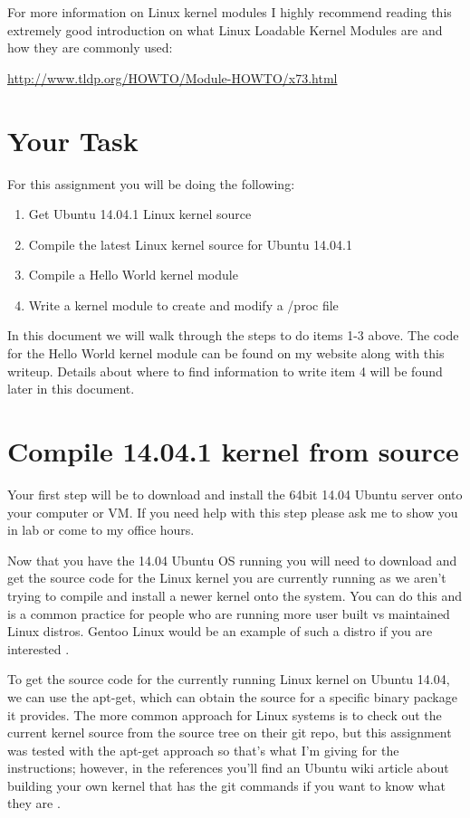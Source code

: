 \documentclass[11pt]{article}
\begin{document}
For more information on Linux kernel modules I highly recommend reading this extremely good introduction on what Linux Loadable Kernel Modules are and how they are commonly used:

{\url{http://www.tldp.org/HOWTO/Module-HOWTO/x73.html}}


\section*{Your Task}

For this assignment you will be doing the following:

\begin{enumerate}
\item{Get Ubuntu 14.04.1 Linux kernel source}
\item{Compile the latest Linux kernel source for Ubuntu 14.04.1}
\item{Compile a Hello World kernel module}
\item{Write a kernel module to create and modify a /proc file}
\end{enumerate}

In this document we will walk through the steps to do items 1-3 above. The code for the Hello World kernel module can be found on my website along with this writeup. Details about where to find information to write item 4 will be found later in this document. 



\section*{Compile 14.04.1 kernel from source}

Your first step will be to download and install the 64bit 14.04 Ubuntu server \cite{ubuntuserver} onto your computer or VM. If you need help with this step please ask me to show you in lab or come to my office hours. 

Now that you have the 14.04 Ubuntu OS running you will need to download and get the source code for the Linux kernel you are currently running as we aren't trying to compile and install a newer kernel onto the system. You can do this and is a common practice for people who are running more user built vs maintained Linux distros. Gentoo Linux would be an example of such a distro if you are interested \cite{gentoo}. 

To get the source code for the currently running Linux kernel on Ubuntu 14.04, we can use the apt-get, which can obtain the source for a specific binary package it provides. The more common approach for Linux systems is to check out the current kernel source from the source tree on their git repo, but this assignment was tested with the apt-get approach so that's what I'm giving for the instructions; however, in the references you'll find an Ubuntu wiki article about building your own kernel that has the git commands if you want to know what they are \cite{ubuntukernel}.
\end{document}
